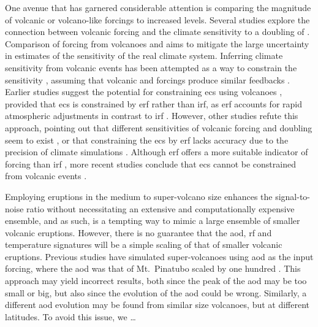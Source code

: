 \documentclass{ametsocV6.1}
\begin{document}
One avenue that has garnered considerable attention is comparing the magnitude of
volcanic or volcano-like forcings to increased  levels. Several studies explore
the connection between volcanic forcing and the climate sensitivity to a doubling of
\citep{boer2007,marvel2016,merlis2014,ollila2016,richardson2019,salvi2022,wigley2005}.
Comparison of forcing from volcanoes and  aims to mitigate the large uncertainty in estimates of the sensitivity
of the real climate system. Inferring climate sensitivity from volcanic events has been
attempted as a way to constrain the sensitivity \citep{boer2007}, assuming that volcanic
and  forcings produce similar feedbacks \citep{pauling2023}. Earlier studies
suggest the potential for constraining \gls{ecs} using volcanoes \citep{bender2010},
provided that \gls{ecs} is constrained by \gls{erf} rather than \gls{irf}, as \gls{erf}
accounts for rapid atmospheric adjustments in contrast to \gls{irf}
\citep{richardson2019}. However, other studies refute this approach, pointing out that
different sensitivities of volcanic forcing and  doubling seem to exist
\citep{douglass2006}, or that constraining the \gls{ecs} by \gls{erf} lacks accuracy due
to the precision of climate simulations \citep{boer2007,salvi2022}. Although \gls{erf}
offers a more suitable indicator of forcing than \gls{irf}
\citep{marvel2016,richardson2019}, more recent studies conclude that \gls{ecs} cannot be
constrained from volcanic events \citep{pauling2023}.

Employing eruptions in the medium to super-volcano size enhances the signal-to-noise
ratio without necessitating an extensive and computationally expensive ensemble, and as
such, is a tempting way to mimic a large ensemble of smaller volcanic eruptions.
However, there is no guarantee that the \gls{aod}, \gls{rf} and temperature signatures
will be a simple scaling of that of smaller volcanic eruptions. Previous studies have
simulated super-volcanoes using \gls{aod} as the input forcing, where the \gls{aod} was
that of Mt.\ Pinatubo scaled by one hundred \citep{jones2005}. This approach may yield
incorrect results, both since the peak of the \gls{aod} may be too small or big, but
also since the evolution of the \gls{aod} could be wrong. Similarly, a different
\gls{aod} evolution may be found from similar size volcanoes, but at different
latitudes. To avoid this issue, we \dots
\end{document}
